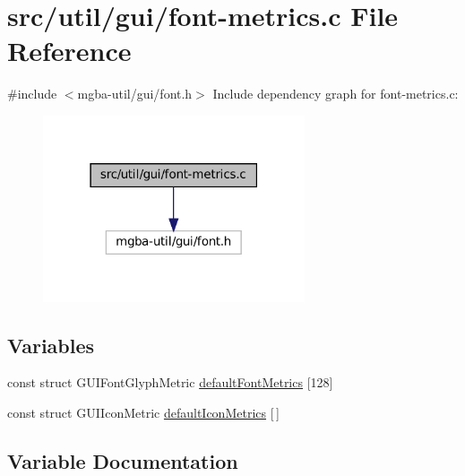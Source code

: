 \hypertarget{font-metrics_8c}{}\section{src/util/gui/font-\/metrics.c File Reference}
\label{font-metrics_8c}
{\ttfamily \#include $<$mgba-\/util/gui/font.\+h$>$}\newline
Include dependency graph for font-\/metrics.c\+:
\nopagebreak
\begin{figure}[H]
\begin{center}
\leavevmode
\includegraphics[width=219pt]{font-metrics_8c__incl}
\end{center}
\end{figure}
\subsection*{Variables}
\begin{DoxyCompactItemize}
\item 
const struct G\+U\+I\+Font\+Glyph\+Metric \mbox{\hyperlink{font-metrics_8c_a1102754e074cdf9b4df65f95afb4a83a}{default\+Font\+Metrics}} \mbox{[}128\mbox{]}
\item 
const struct G\+U\+I\+Icon\+Metric \mbox{\hyperlink{font-metrics_8c_a4ca05ea0ad010effc5a4b5a6c5c20232}{default\+Icon\+Metrics}} \mbox{[}$\,$\mbox{]}
\end{DoxyCompactItemize}


\subsection{Variable Documentation}
\mbox{\label{font-metrics_8c_a1102754e074cdf9b4df65f95afb4a83a}} 
